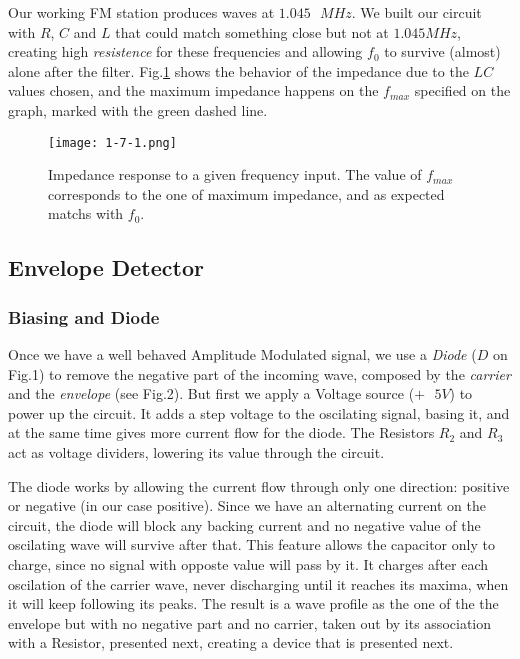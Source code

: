 \documentclass{article}
\begin{document}
Our working FM station produces waves at
$1.045 \text{ }MHz$. We built our circuit with $R$, $C$ and
$L$ that could match something close but not at $1.045 \text{
}MHz$, creating high \emph{resistence} for these frequencies and
allowing $f_{0}$ to survive (almost) alone after the filter. Fig.\ref{LC} shows the
behavior of the impedance due to the $LC$ values chosen, and
the maximum impedance happens on the $f_{max}$ specified on the graph,
marked with the green dashed line. 

\begin{figure}[H]
\center
\texttt{[image: 1-7-1.png]}
\caption {Impedance response to a given frequency input. The value of $f_{max}$ corresponds to the one of maximum impedance, and as expected matchs with $f_{0}$.} 
\label{LC}
\end{figure}

\subsection{Envelope Detector}

\subsubsection{Biasing and Diode}

Once we have a well behaved Amplitude Modulated signal, we use a \emph{Diode} ($D$ on Fig.1) to remove the negative part of the incoming wave, composed by the \emph{carrier} and the \emph{envelope} (see Fig.2). But first we apply a Voltage source ($+ \text{ }5V$) to power up the circuit. It adds a step voltage to the oscilating signal, basing it, and at the same time gives more current flow for the diode. The Resistors $R_{2}$ and $R_{3}$ act as voltage dividers, lowering its value through the circuit. 

The diode works by allowing the current flow through only one direction:
positive or negative (in our case positive). Since we have an alternating current on the circuit,
the diode will block any backing current and no negative value of the
oscilating wave will survive after that. This feature allows the capacitor only to charge, since no
signal with opposte value will pass by it. It charges after each oscilation of the carrier wave, 
never discharging until it reaches its maxima, when it will keep following its peaks. 
The result is a wave profile as
the one of the the envelope but with no negative part and no carrier,
taken out by its association with a Resistor, presented
next, creating a device that is presented next. 
\end{document}
